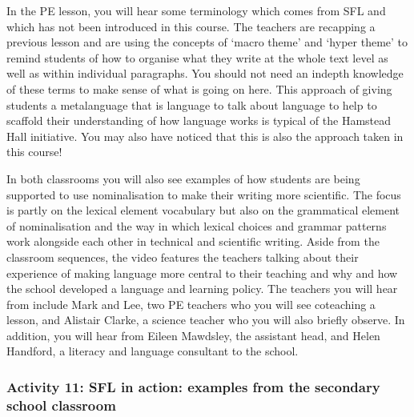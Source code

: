 \documentclass[letterpaper,10pt,english]{sphinxmanual}
\begin{document}
In the PE lesson, you will hear some terminology which comes from SFL and which has not been introduced in this course. The teachers are recapping a previous lesson and are using the concepts of ‘macro theme’ and ‘hyper theme’ to remind students of how to organise what they write at the whole text level as well as within individual paragraphs. You should not need an in\sphinxhyphen{}depth knowledge of these terms to make sense of what is going on here. This approach of giving students a metalanguage \textendash{} that is
language to talk about language \textendash{} to help to scaffold their understanding of how language works is typical of the Hamstead Hall initiative. You may also have noticed that this is also the approach taken in this course!

In both classrooms you will also see examples of how students are being supported to use nominalisation to make their writing more scientific. The focus is partly on the lexical element \textendash{} vocabulary \textendash{} but also on the grammatical element of nominalisation and the way in which lexical choices and grammar patterns work alongside each other in technical and scientific writing. Aside from the classroom sequences, the video features the teachers talking about their experience of making language more
central to their teaching and why and how the school developed a language and learning policy. The teachers you will hear from include Mark and Lee, two PE teachers who you will see co\sphinxhyphen{}teaching a lesson, and Alistair Clarke, a science teacher who you will also briefly observe. In addition, you will hear from Eileen Mawdsley, the assistant head, and Helen Handford, a literacy and language consultant to the school.


\subsubsection{Activity 11: SFL in action: examples from the secondary school classroom}
\label{\detokenize{content/session_00/Part_00_07:Activity-11:-SFL-in-action:-examples-from-the-secondary-school-classroom}}
\end{document}
